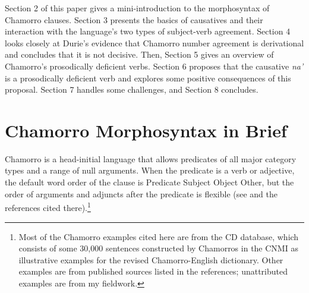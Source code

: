 \documentclass[output=paper,
modfonts
]{LSP/langsci}
\begin{document}
Section 2 of this paper gives a mini-introduction to the morphosyntax of
Chamorro clauses. Section 3 presents the basics of causatives and their
interaction with the language's two types of subject-verb agreement.
Section 4 looks closely at Durie's \citeyear{durie1986} evidence that Chamorro number
agreement is derivational and concludes that it is not decisive. Then,
Section 5 gives an overview of Chamorro's prosodically deficient verbs.
Section 6 proposes that the causative \emph{na'} is a prosodically
deficient verb and explores some positive consequences of this proposal.
Section 7 handles some challenges, and Section 8 concludes.

\section{Chamorro Morphosyntax in Brief}

Chamorro is a head-initial language that allows predicates of all major
category types and a range of null arguments. When the predicate is a
verb or adjective, the default word order of the clause is Predicate
Subject Object Other, but the order of arguments and adjuncts after the
predicate is flexible (see \citealt{chung1998} and the references cited
there).\footnote{Most of the Chamorro examples cited here are from the CD database,
  which consists of some 30,000 sentences constructed by Chamorros in
  the CNMI as illustrative examples for the revised Chamorro-English
  dictionary. Other examples are from published sources listed in the
  references; unattributed examples are from my fieldwork.}
\end{document}
